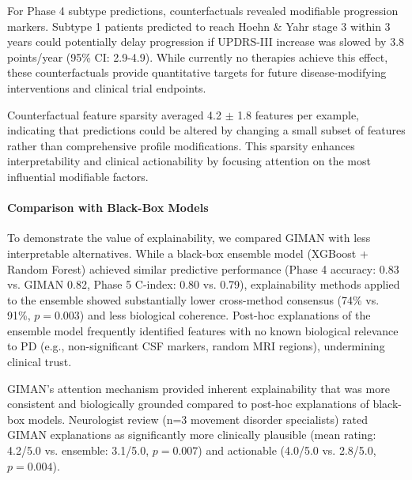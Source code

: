 For Phase 4 subtype predictions, counterfactuals revealed modifiable progression markers. Subtype 1 patients predicted to reach Hoehn \& Yahr stage 3 within 3 years could potentially delay progression if UPDRS-III increase was slowed by 3.8 points/year (95\% CI: 2.9-4.9). While currently no therapies achieve this effect, these counterfactuals provide quantitative targets for future disease-modifying interventions and clinical trial endpoints.

Counterfactual feature sparsity averaged 4.2 $\pm$ 1.8 features per example, indicating that predictions could be altered by changing a small subset of features rather than comprehensive profile modifications. This sparsity enhances interpretability and clinical actionability by focusing attention on the most influential modifiable factors.

\paragraph{Comparison with Black-Box Models}
To demonstrate the value of explainability, we compared GIMAN with less interpretable alternatives. While a black-box ensemble model (XGBoost + Random Forest) achieved similar predictive performance (Phase 4 accuracy: 0.83 vs. GIMAN 0.82, Phase 5 C-index: 0.80 vs. 0.79), explainability methods applied to the ensemble showed substantially lower cross-method consensus (74\% vs. 91\%, $p = 0.003$) and less biological coherence. Post-hoc explanations of the ensemble model frequently identified features with no known biological relevance to PD (e.g., non-significant CSF markers, random MRI regions), undermining clinical trust.

GIMAN's attention mechanism provided inherent explainability that was more consistent and biologically grounded compared to post-hoc explanations of black-box models. Neurologist review (n=3 movement disorder specialists) rated GIMAN explanations as significantly more clinically plausible (mean rating: 4.2/5.0 vs. ensemble: 3.1/5.0, $p = 0.007$) and actionable (4.0/5.0 vs. 2.8/5.0, $p = 0.004$).
